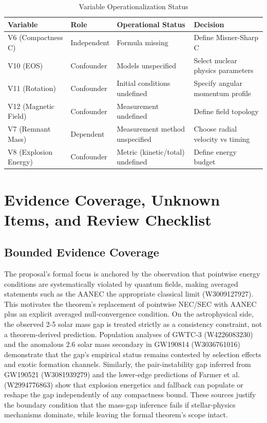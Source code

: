 \documentclass[conference]{IEEEtran}
\begin{document}
\begin{table}[htbp]
\centering
\footnotesize
\setlength{\tabcolsep}{3pt}
\renewcommand{\arraystretch}{1.12}
\caption{Variable Operationalization Status}
\label{tab:appendix-variables-and-definitions-block-4}
\begin{tabular}{|p{}|p{}|p{}|p{}|}
\hline
Variable & Role & Operational Status & Decision \\\hline
V6 (Compactness C) & Independent & Formula missing & Define Misner-Sharp C \\\hline
V10 (EOS) & Confounder & Models unspecified & Select nuclear physics parameters \\\hline
V11 (Rotation) & Confounder & Initial conditions undefined & Specify angular momentum profile \\\hline
V12 (Magnetic Field) & Confounder & Measurement undefined & Define field topology \\\hline
V7 (Remnant Mass) & Dependent & Measurement method unspecified & Choose radial velocity vs timing \\\hline
V8 (Explosion Energy) & Confounder & Metric (kinetic/total) undefined & Define energy budget \\\hline
\end{tabular}
\end{table}

\section{Evidence Coverage, Unknown Items, and Review Checklist}
\subsection{Bounded Evidence Coverage}
The proposal's formal focus is anchored by the observation that pointwise energy conditions are systematically violated by quantum fields, making averaged statements such as the AANEC the appropriate classical limit (W3009127927). This motivates the theorem's replacement of pointwise NEC/SEC with AANEC plus an explicit averaged null-convergence condition. On the astrophysical side, the observed 2-5 solar mass gap is treated strictly as a consistency constraint, not a theorem-derived prediction. Population analyses of GWTC-3 (W4226083230) and the anomalous 2.6 solar mass secondary in GW190814 (W3036761016) demonstrate that the gap's empirical status remains contested by selection effects and exotic formation channels. Similarly, the pair-instability gap inferred from GW190521 (W3081939279) and the lower-edge predictions of Farmer et al. (W2994776863) show that explosion energetics and fallback can populate or reshape the gap independently of any compactness bound. These sources justify the boundary condition that the mass-gap inference fails if stellar-physics mechanisms dominate, while leaving the formal theorem's scope intact.~\cite{cite_0ed84243cf171bc4,cite_f634820e22d7a238,cite_7a407c865faafd11,cite_cbbced417410bc6c,cite_fd0f77b2a173c0ab}
\end{document}
